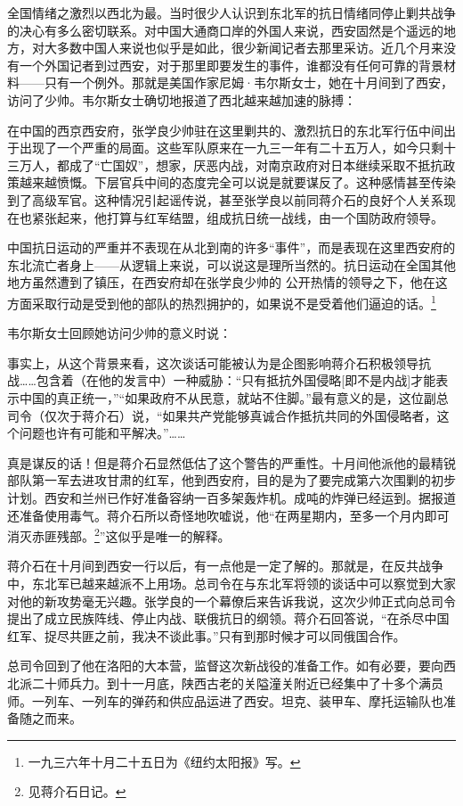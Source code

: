 \documentclass[10pt]{book}
\begin{document}
全国情绪之激烈以西北为最。当时很少人认识到东北军的抗日情绪同停止剿共战争的决心有多么密切联系。对中国大通商口岸的外国人来说，西安固然是个遥远的地方，对大多数中国人来说也似乎是如此，很少新闻记者去那里采访。近几个月来没有一个外国记者到过西安，对于那里即要发生的事件，谁都没有任何可靠的背景材料——只有一个例外。那就是美国作家尼姆·韦尔斯女士，她在十月间到了西安，访问了少帅。韦尔斯女士确切地报道了西北越来越加速的脉搏：

在中国的西京西安府，张学良少帅驻在这里剿共的、激烈抗日的东北军行伍中间出于出现了一个严重的局面。这些军队原来在一九三一年有二十五万人，如今只剩十三万人，都成了“亡国奴”，想家，厌恶内战，对南京政府对日本继续采取不抵抗政策越来越愤慨。下层官兵中间的态度完全可以说是就要谋反了。这种感情甚至传染到了高级军官。这种情况引起谣传说，甚至张学良以前同蒋介石的良好个人关系现在也紧张起来，他打算与红军结盟，组成抗日统一战线，由一个国防政府领导。

中国抗日运动的严重并不表现在从北到南的许多“事件”，而是表现在这里西安府的东北流亡者身上——从逻辑上来说，可以说这是理所当然的。抗日运动在全国其他地方虽然遭到了镇压，在西安府却在张学良少帅的 公开热情的领导之下，他在这方面采取行动是受到他的部队的热烈拥护的，如果说不是受着他们逼迫的话。\footnote{一九三六年十月二十五日为《纽约太阳报》写。}

韦尔斯女士回顾她访问少帅的意义时说：

事实上，从这个背景来看，这次谈话可能被认为是企图影响蒋介石积极领导抗战……包含着（在他的发言中）一种威胁：“只有抵抗外国侵略[即不是内战]才能表示中国的真正统一，”“如果政府不从民意，就站不住脚。”最有意义的是，这位副总司令（仅次于蒋介石）说，“如果共产党能够真诚合作抵抗共同的外国侵略者，这个问题也许有可能和平解决。”……

真是谋反的话！但是蒋介石显然低估了这个警告的严重性。十月间他派他的最精锐部队第一军去进攻甘肃的红军，他到西安府，目的是为了要完成第六次围剿的初步计划。西安和兰州已作好准备容纳一百多架轰炸机。成吨的炸弹已经运到。据报道还准备使用毒气。蒋介石所以奇怪地吹嘘说，他“在两星期内，至多一个月内即可消灭赤匪残部。\footnote{见蒋介石日记。}”这似乎是唯一的解释。

蒋介石在十月间到西安一行以后，有一点他是一定了解的。那就是，在反共战争中，东北军已越来越派不上用场。总司令在与东北军将领的谈话中可以察觉到大家对他的新攻势毫无兴趣。张学良的一个幕僚后来告诉我说，这次少帅正式向总司令提出了成立民族阵线、停止内战、联俄抗日的纲领。蒋介石回答说，“在杀尽中国红军、捉尽共匪之前，我决不谈此事。”只有到那时候才可以同俄国合作。

总司令回到了他在洛阳的大本营，监督这次新战役的准备工作。如有必要，要向西北派二十师兵力。到十一月底，陕西古老的关隘潼关附近已经集中了十多个满员师。一列车、一列车的弹药和供应品运进了西安。坦克、装甲车、摩托运输队也准备随之而来。
\end{document}
